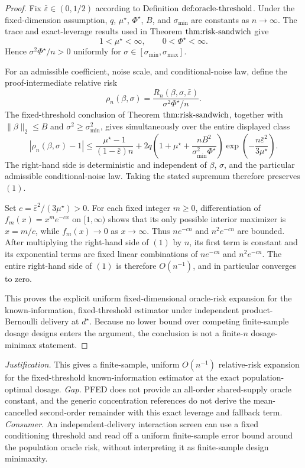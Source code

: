 \documentclass{article}
\begin{document}
\begin{proof}
Fix \(\bar\varepsilon\in(0,1/2)\) according to Definition \(\textnormal{def:oracle-threshold}\).  Under the fixed-dimension assumption, \(q\), \(\mu^\star\), \(\Phi^\star\), \(B\), and \(\sigma_{\min}\) are constants as \(n\to\infty\).  The trace and exact-leverage results used in Theorem \(\textnormal{thm:risk-sandwich}\) give
\[
 1<\mu^\star<\infty,
 \qquad
 0<\Phi^\star<\infty.
\]
Hence \(\sigma^2\Phi^\star/n>0\) uniformly for \(\sigma\in[\sigma_{\min},\sigma_{\max}]\).

For an admissible coefficient, noise scale, and conditional-noise law, define the proof-intermediate relative risk
\[
 \rho_n(\beta,\sigma)
 =\frac{R_n(\beta,\sigma,\bar\varepsilon)}{\sigma^2\Phi^\star/n}.
\]
The fixed-threshold conclusion of Theorem \(\textnormal{thm:risk-sandwich}\), together with \(\|\beta\|_2\le B\) and \(\sigma^2\ge\sigma_{\min}^2\), gives simultaneously over the entire displayed class
\[
 \left|\rho_n(\beta,\sigma)-1\right|
 \le
 \frac{\mu^\star-1}{(1-\bar\varepsilon)n}
 +2q\left(1+\mu^\star+
 \frac{nB^2}{\sigma_{\min}^2\Phi^\star}\right)
 \exp\!\left(-\frac{n\bar\varepsilon^2}{3\mu^\star}\right).
 \tag{1}
\]
The right-hand side is deterministic and independent of \(\beta\), \(\sigma\), and the particular admissible conditional-noise law.  Taking the stated supremum therefore preserves \((1)\).

Set \(c=\bar\varepsilon^2/(3\mu^\star)>0\).  For each fixed integer \(m\ge0\), differentiation of \(f_m(x)=x^me^{-cx}\) on \([1,\infty)\) shows that its only possible interior maximizer is \(x=m/c\), while \(f_m(x)\to0\) as \(x\to\infty\).  Thus \(ne^{-cn}\) and \(n^2e^{-cn}\) are bounded.  After multiplying the right-hand side of \((1)\) by \(n\), its first term is constant and its exponential terms are fixed linear combinations of \(ne^{-cn}\) and \(n^2e^{-cn}\).  The entire right-hand side of \((1)\) is therefore \(O(n^{-1})\), and in particular converges to zero.

This proves the explicit uniform fixed-dimensional oracle-risk expansion for the known-information, fixed-threshold estimator under independent product-Bernoulli delivery at \(d^\star\).  Because no lower bound over competing finite-sample dosage designs enters the argument, the conclusion is not a finite-\(n\) dosage-minimax statement.
\end{proof}
\par\smallskip\noindent \textit{Justification.} This gives a finite-sample, uniform \(O(n^{-1})\) relative-risk expansion for the fixed-threshold known-information estimator at the exact population-optimal dosage. \textit{Gap.} PFED does not provide an all-order shared-supply oracle constant, and the generic concentration references do not derive the mean-cancelled second-order remainder with this exact leverage and fallback term. \textit{Consumer.} An independent-delivery interaction screen can use a fixed conditioning threshold and read off a uniform finite-sample error bound around the population oracle risk, without interpreting it as finite-sample design minimaxity.
\end{document}
